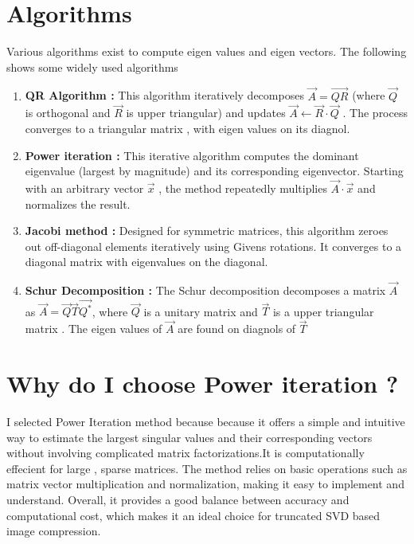 \documentclass[journal,12pt,onecolumn]{IEEEtran}
\theoremstyle{remark}
\begin{document}
\section{\textbf{Algorithms}}
\vspace{1em}
\begin{justify}
    Various algorithms exist to compute eigen values and eigen vectors. The following shows some widely used algorithms 

    \begin{enumerate}
        \item \textbf{QR Algorithm :} This algorithm iteratively decomposes $\vec{A}=\vec{QR}$ (where $\vec{Q}$ is orthogonal and $\vec{R}$ is upper triangular) and updates $\vec{A} \leftarrow \vec{R}\cdot \vec{Q}$ . The process converges to a triangular matrix , with eigen values on its diagnol.
        \item \textbf{Power iteration :} This iterative algorithm computes the dominant eigenvalue (largest by magnitude) and its corresponding eigenvector. Starting with an arbitrary vector $\vec{x}$ , the method repeatedly multiplies $\vec{A}\cdot \vec{x}$ and normalizes the result.
        \item \textbf{Jacobi method :} Designed for symmetric matrices, this algorithm zeroes out off-diagonal elements iteratively using Givens rotations. It converges to a diagonal matrix with eigenvalues on the diagonal.
        \item \textbf{Schur Decomposition :} The Schur decomposition decomposes a matrix $\vec{A}$ as $\vec{A} = \vec{Q}\vec{T}\vec{Q^*}$, where $\vec{Q}$ is a unitary matrix and $\vec{T}$ is a upper triangular matrix . The eigen values of  $\vec{A}$ are found on diagnols of $\vec{T}$
    \end{enumerate}
\end{justify}

\newpage

\section{\textbf{Why do I choose Power iteration ?}}
\vspace{1em}
\begin{justify}
    I selected Power Iteration method because because it offers a simple and intuitive way to estimate the largest singular values and their corresponding vectors without involving complicated matrix factorizations.It is computationally effecient for large , sparse matrices. The method relies on basic operations such as matrix vector multiplication and normalization, making it easy to implement and understand. Overall, it provides a good balance between accuracy and computational cost, which makes it an ideal choice for truncated SVD based image compression.
\end{justify}
\vspace{1em}
\end{document}
